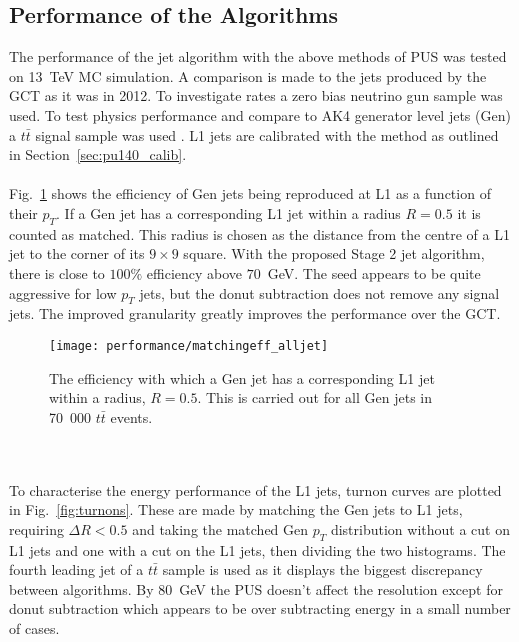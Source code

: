 \subsection{Performance of the Algorithms}
\label{sec:jet_algo_performance}
The performance of the jet algorithm with the above methods of PUS was tested on 13~TeV MC simulation. A comparison is made to the jets produced by the GCT as it was in 2012. To investigate rates a zero bias neutrino gun sample was used. To test physics performance and compare to AK4 generator level jets (Gen) a $t\bar{t}$ signal sample was used . L1 jets are calibrated with the method as outlined in Section~\ref{sec:pu140_calib}.
\\\\
Fig.~\ref{fig:matchingeff} shows the efficiency of Gen jets being reproduced at L1 as a function of their $p_T$. If a Gen jet has a corresponding L1 jet within a radius $R=0.5$ it is counted as matched. This radius is chosen as the distance from the centre of a L1 jet to the corner of its $9\times9$ square. With the proposed Stage 2 jet algorithm, there is close to $100\%$ efficiency above $70$~GeV. The seed appears to be quite aggressive for low $p_T$ jets, but the donut subtraction does not remove any signal jets. The improved granularity greatly improves the performance over the GCT.
\begin{figure}
	\begin{center}
		\texttt{[image: performance/matchingeff\_alljet]}
	\end{center}
	\caption{The efficiency with which a Gen jet has a corresponding L1 jet within a radius, $R=0.5$. This is carried out for all Gen jets in 70~000 $t\bar{t}$ events.}
	\label{fig:matchingeff}
\end{figure}
\\\\
\noindent To characterise the energy performance of the L1 jets, turnon curves are plotted in Fig.~\ref{fig:turnons}. These are made by matching the Gen jets to L1 jets, requiring $\Delta R<0.5$ and taking the matched Gen $p_T$ distribution without a cut on L1 jets and one with a cut on the L1 jets, then dividing the two histograms. The fourth leading jet of a $t\bar{t}$ sample is used as it displays the biggest discrepancy between algorithms. By $80$~GeV the PUS doesn't affect the resolution except for donut subtraction which appears to be over subtracting energy in a small number of cases.
